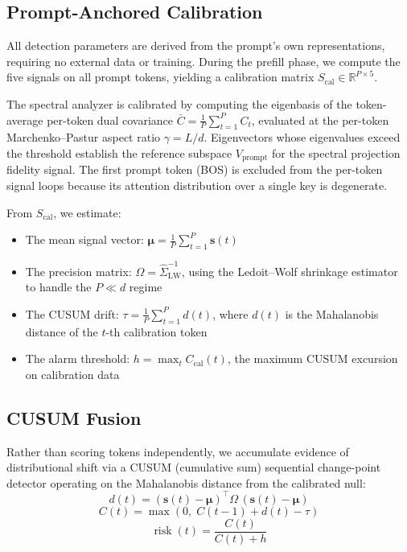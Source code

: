 \documentclass{article}
\begin{document}
\subsection{Prompt-Anchored Calibration}
\label{sec:calibration}

All detection parameters are derived from the prompt's own representations, requiring no external data or training. During the prefill phase, we compute the five signals on all prompt tokens, yielding a calibration matrix $S_{\text{cal}} \in \mathbb{R}^{P \times 5}$.

The spectral analyzer is calibrated by computing the eigenbasis of the token-average per-token dual covariance $\bar{C} = \frac{1}{P} \sum_{t=1}^{P} C_t$, evaluated at the per-token Marchenko--Pastur aspect ratio $\gamma = L/d$. Eigenvectors whose eigenvalues exceed the threshold establish the reference subspace $V_{\text{prompt}}$ for the spectral projection fidelity signal. The first prompt token (BOS) is excluded from the per-token signal loops because its attention distribution over a single key is degenerate.

From $S_{\text{cal}}$, we estimate:
\begin{itemize}
    \item The mean signal vector: $\bm{\mu} = \frac{1}{P} \sum_{t=1}^{P} \bm{s}(t)$
    \item The precision matrix: $\Omega = \hat{\Sigma}_{\text{LW}}^{-1}$, using the Ledoit--Wolf shrinkage estimator~\citep{ledoit2004well} to handle the $P \ll d$ regime
    \item The CUSUM drift: $\tau = \frac{1}{P} \sum_{t=1}^{P} d(t)$, where $d(t)$ is the Mahalanobis distance of the $t$-th calibration token
    \item The alarm threshold: $h = \max_t C_{\text{cal}}(t)$, the maximum CUSUM excursion on calibration data
\end{itemize}

\subsection{CUSUM Fusion}
\label{sec:fusion}

Rather than scoring tokens independently, we accumulate evidence of distributional shift via a CUSUM (cumulative sum) sequential change-point detector operating on the Mahalanobis distance from the calibrated null:
\begin{equation}
    d(t) = (\bm{s}(t) - \bm{\mu})^\top \Omega\, (\bm{s}(t) - \bm{\mu})
    \label{eq:mahal}
\end{equation}
\begin{equation}
    C(t) = \max\!\left(0,\; C(t-1) + d(t) - \tau\right)
    \label{eq:cusum}
\end{equation}
\begin{equation}
    \operatorname{risk}(t) = \frac{C(t)}{C(t) + h}
    \label{eq:risk}
\end{equation}
\end{document}
